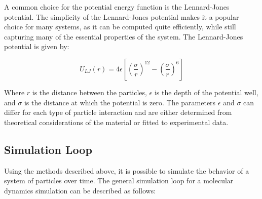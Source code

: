 A common choice for the potential energy function is the Lennard-Jones potential. The simplicity of the Lennard-Jones potential makes it a popular choice for many systems, as it can be computed quite efficiently, while still capturing many of the essential properties of the system. The Lennard-Jones potential is given by:

\begin{equation}
      U_{LJ}(r) = 4 \epsilon \left[ \left( \frac{\sigma}{r} \right)^{12} - \left( \frac{\sigma}{r} \right)^6 \right]
\end{equation}


Where $r$ is the distance between the particles, $\epsilon$ is the depth of the potential well, and $\sigma$ is the distance at which the potential is zero. The parameters $\epsilon$ and $\sigma$ can differ for each type of particle interaction and are either determined from theoretical considerations of the material or fitted to experimental data.

\subsection{Simulation Loop}

Using the methods described above, it is possible to simulate the behavior of a system of particles over time. The general simulation loop for a molecular dynamics simulation can be described as follows:

